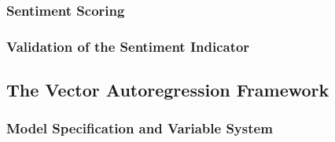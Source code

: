 \documentclass[12pt]{scrartcl}
\numberwithin{equation}{section}				%
\begin{document}
    \subsubsection{Sentiment Scoring}
    
    \subsubsection{Validation of the Sentiment Indicator}
    
    \subsection{The Vector Autoregression Framework}
    
    \subsubsection{Model Specification and Variable System}
    
\end{document}
